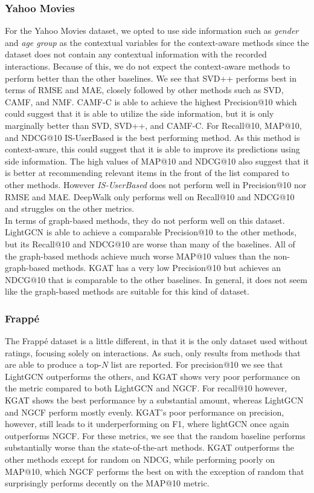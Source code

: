 \subsubsection{Yahoo Movies}
For the Yahoo Movies dataset, we opted to use side information such as \textit{gender} and \textit{age group} as the contextual variables for the context-aware methods since the dataset does not contain any contextual information with the recorded interactions.
Because of this, we do not expect the context-aware methods to perform better than the other baselines.
We see that SVD++ performs best in terms of RMSE and MAE, closely followed by other methods such as SVD, CAMF, and NMF.
CAMF-C is able to achieve the highest Precision@10 which could suggest that it is able to utilize the side information, but it is only marginally better than SVD, SVD++, and CAMF-C.
For Recall@10, MAP@10, and NDCG@10 IS-UserBased is the best performing method.
As this method is context-aware, this could suggest that it is able to improve its predictions using side information.
The high values of MAP@10 and NDCG@10 also suggest that it is better at recommending relevant items in the front of the list compared to other methods.
However \textit{IS-UserBased} does not perform well in Precision@10 nor RMSE and MAE.
DeepWalk only performs well on Recall@10 and NDCG@10 and struggles on the other metrics.
\\
In terms of graph-based methods, they do not perform well on this dataset.
LightGCN is able to achieve a comparable Precision@10 to the other methods, but its Recall@10 and NDCG@10 are worse than many of the baselines.
All of the graph-based methods achieve much worse MAP@10 values than the non-graph-based methods.
KGAT has a very low Precision@10 but achieves an NDCG@10 that is comparable to the other baselines.
In general, it does not seem like the graph-based methods are suitable for this kind of dataset.

\subsubsection{Frappé}
The Frappé dataset is a little different, in that it is the only dataset used without ratings, focusing solely on interactions.
As such, only results from methods that are able to produce a top-$N$ list are reported.
For precision@10 we see that LightGCN outperforms the others, and KGAT shows very poor performance on the metric compared to both LightGCN and NGCF.
For recall@10 however, KGAT shows the best performance by a substantial amount, whereas LightGCN and NGCF perform mostly evenly.
KGAT's poor performance on precision, however, still leads to it underperforming on F1, where lightGCN once again outperforms NGCF.
For these metrics, we see that the random baseline performs substantially worse than the state-of-the-art methods.
KGAT outperforms the other methods except for random on NDCG, while performing poorly on MAP@10, which NGCF performs the best on with the exception of random that surprisingly performs decently on the MAP@10 metric.
